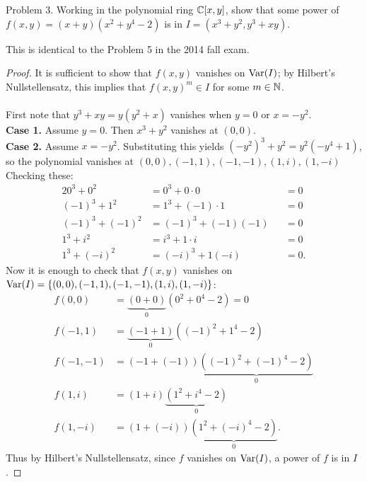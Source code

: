 \documentclass{article}
\begin{document}
\begin{subsection}{Problem 3.}
  Working in the polynomial ring $\mathbb C[x, y]$, show that some power of
  $f(x,y) = (x + y)(x^2 + y^4 -2)$ is in $I = (x^3 + y^2, y^3 + xy)$.
\end{subsection}
\begin{note}
  This is identical to the Problem 5 in the 2014 fall exam.
\end{note}
\begin{proof}
  It is sufficient to show that $f(x,y)$ vanishes on $\operatorname{Var}(I)$; by
  Hilbert's Nullstellensatz,
  this implies that $f(x,y)^m \in I$ for some $m \in \mathbb N$.
  \\~\\
  First note that $y^3 + xy = y(y^2 + x)$ vanishes when $y = 0$ or $x = -y^2$.
  \\
  \textbf{Case 1.} Assume $y = 0$. Then $x^3 + y^2$ vanishes at $(0, 0)$.
  \\
  \textbf{Case 2.} Assume $x = -y^2$. Substituting this yields
  $(-y^2)^3 + y^2 = y^2(-y^4 + 1)$, so the polynomial vanishes at
  $(0,0),(-1,1), (-1,-1),(1,i),(1,-i)$
  Checking these: \begin{alignat*}{2}
    0^3 + 0^2 &= 0^3 + 0 \cdot 0 &&= 0 \\
    (-1)^3 + 1^2 &= 1^3 + (-1) \cdot 1 &&= 0 \\
    (-1)^3 + (-1)^2 &= (-1)^3 + (-1)(-1) &&= 0 \\
    1^3 + i^2 &= i^3 + 1 \cdot i &&= 0 \\
    1^3 + (-i)^2 &= (-i)^3 + 1(-i) &&= 0.
  \end{alignat*}
  Now it is enough to check that $f(x,y)$ vanishes on
  $\operatorname{Var}(I) = \{(0,0),(-1,1), (-1,-1),(1,i),(1,-i)\}$: \begin{align*}
    f(0, 0) &= \underbrace{(0 + 0)}_0(0^2 + 0^4 - 2) = 0\\
    f(-1, 1) &= \underbrace{(-1 + 1)}_0((-1)^2 + 1^4 - 2) \\
    f(-1, -1) &= (-1 + (-1))\underbrace{((-1)^2 + (-1)^4 - 2)}_0 \\
    f(1, i) &= (1 + i)\underbrace{(1^2 + i^4 - 2)}_0 \\
    f(1, -i) &= (1 + (-i))\underbrace{(1^2 + (-i)^4 - 2)}_0.
  \end{align*}
  Thus by Hilbert's Nullstellensatz, since $f$ vanishes on $\operatorname{Var}(I)$, a power of
  $f$ is in $I$.
\end{proof}
\pagebreak
\end{document}
